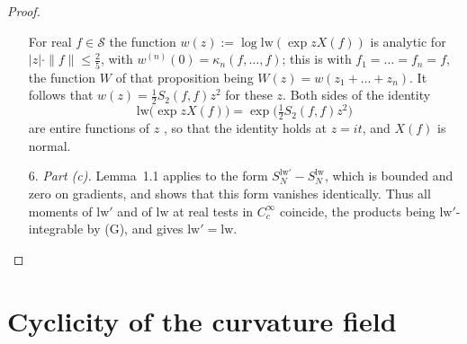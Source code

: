 \documentclass[11pt]{amsart}
\theoremstyle{definition}
\begin{document}
\begin{proof}
\begin{enumerate}
For real $f\in\mathcal S$ the function $w(z):=\log\mathrm{lw}(\exp zX(f))$ is analytic for $|z|\cdot\|f\|\le\tfrac25$, with $w^{(n)}(0)=\kappa_n(f,\dots,f)$; this is \cite[Proposition~7.10\,(7)]{QEDI} with $f_1=\dots=f_n=f$, the function $W$ of that proposition being $W(z)=w(z_1+\dots+z_n)$.
It follows that $w(z)=\tfrac12S_2(f,f)z^2$ for these $z$.
Both sides of the identity
\begin{equation*}
\mathrm{lw}\bigl(\exp zX(f)\bigr)=\exp\bigl(\tfrac12S_2(f,f)z^2\bigr)
\end{equation*}
are entire functions of $z$ \cite[Proposition~7.10\,(1)]{QEDI}, so that the identity holds at $z=it$, and $X(f)$ is normal.
\item[6.] \emph{Part (c).}
Lemma~1.1 applies to the form $S_N^{\mathrm{lw}'}-S_N^{\mathrm{lw}}$, which is bounded \cite[Lemma~14.3\,(b)]{QEDII} and zero on gradients, and shows that this form vanishes identically.
Thus all moments of $\mathrm{lw}'$ and of $\mathrm{lw}$ at real tests in $C_c^\infty$ coincide, the products being $\mathrm{lw}'$-integrable by (G), and \cite[Proposition~45.1\,(8),~(11)]{QEDIII} gives $\mathrm{lw}'=\mathrm{lw}$.
\end{enumerate}
\end{proof}


\section{Cyclicity of the curvature field}
\end{document}
